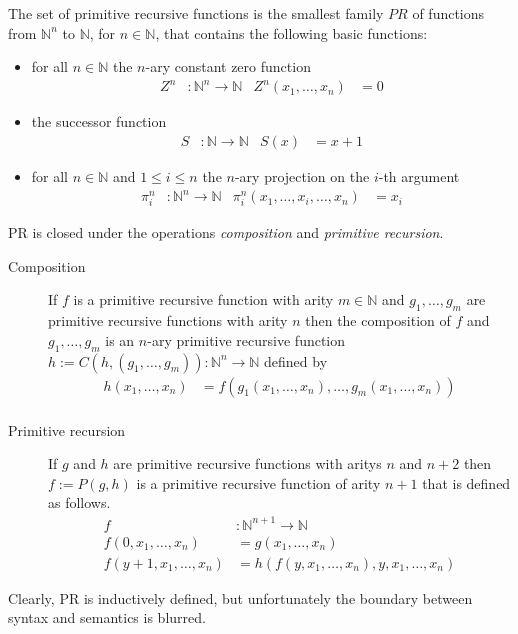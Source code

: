 \documentclass{jfp}
\newcommand{\xn}{x_1,\dots,x_n }
\begin{document}
The set of primitive recursive functions is the smallest family $PR$ of functions
from ${ℕ}^n$  to ${ℕ}$, for $n\in {ℕ}$, that contains the following
basic functions:
\begin{itemize}
\item for all $n\in {ℕ}$ the $n$-ary constant zero function
  \begin{align*}
	Z^n  &\colon \mathbb{N}^n \rightarrow \mathbb{N}  &
	Z^n    (\xn) &= 0  
  \end{align*}
\item the successor function
  \begin{align*}
	S &\colon \mathbb{N} \rightarrow \mathbb{N} &
	S  (x)  &=  x + 1
  \end{align*}
\item for all $n\in {ℕ}$ and $1\le i\le n$ the $n$-ary projection on
  the $i$-th argument
\begin{align*}
	\pi^{n}_{i} &\colon \mathbb{N}^n \rightarrow \mathbb{N} &
	\pi^{n}_{i}  (x_1,\dots,x_i,\dots,x_n)  &= x_i
\end{align*}
\end{itemize}
PR is closed under the operations \emph{composition} and \emph{primitive recursion}.
\begin{description}
\item[Composition] 
If $f$ is a primitive recursive function with arity $m \in {ℕ}$ and $g_1,
\dots, g_m$ are primitive recursive functions with arity $n$ then the
composition of $f$ and $g_1, \dots, g_m$ is an $n$-ary primitive recursive function
$h := C (h,(g_1,\dots, g_m)) \colon \mathbb{N}^n \rightarrow \mathbb{N} $ defined by
\begin{align*}
	h  (\xn)  &= f (g_1(\xn),\dots,g_m(\xn)) \\
\end{align*}

\item[Primitive recursion] 
If $g$ and $h$ are primitive recursive functions with aritys $n$ and
$n+2$ then $f := P (g,h)$ is a primitive recursive function of arity $n+1$ that is defined as follows.
\begin{align*}
	f&\colon \mathbb{N}^{n+1} \rightarrow \mathbb{N} \\
	f  (0,\xn)  &= g (\xn) \\
	f  (y + 1,\xn) &= h(  f(y,\xn),y,\xn)
\end{align*}

\end{description}

Clearly, PR is inductively defined, but unfortunately the boundary
between syntax and semantics is blurred.
\end{document}
